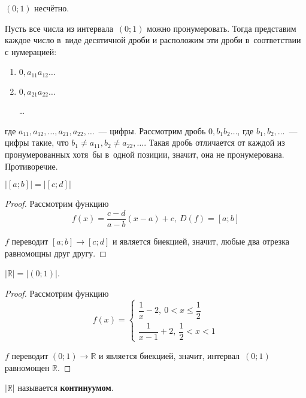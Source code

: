 \begin{statement}
$(0; 1)$ несчётно.
\end{statement}
\begin{proofcontra}
Пусть все числа из интервала~$(0; 1)$ можно пронумеровать.
Тогда представим каждое число в~виде десятичной дроби и расположим эти дроби в~соответствии с нумерацией:
\begin{enumerate}
	\item $0{,}a_{11}a_{12} \ldots$
	\item $0{,}a_{21}a_{22} \ldots$
	
	\ldots
\end{enumerate}
где $a_{11}, a_{12}, \ldots, a_{21}, a_{22}, \ldots$~--- цифры.
Рассмотрим дробь $0{,}b_1 b_2 \ldots$, где $b_1, b_2, \ldots$~--- цифры такие, что $b_1 \neq a_{11}, b_2 \neq a_{22}, \ldots$.
Такая дробь отличается от каждой из пронумерованных хотя~бы в~одной позиции, значит, она не пронумерована.
Противоречие.
\end{proofcontra}

\begin{statement}
$\left| [a; b] \right| = \left| [c; d] \right|$
\end{statement}
\begin{proof}
Рассмотрим функцию
\begin{equation*}
f(x) = \frac{c - d}{a - b} (x - a) + c, \ D(f) = [a; b]
\end{equation*}

$f$ переводит $[a; b] \to [c; d]$ и является биекцией, значит, любые два отрезка равномощны друг другу.
\end{proof}

\begin{statement}
$|\mathbb R| = |(0; 1)|$.
\end{statement}
\begin{proof}
Рассмотрим функцию
\begin{equation*}
f(x) =
\begin{cases}
\dfrac1x - 2, \ 0 < x \leqslant \dfrac12 \\
\dfrac1{x - 1} + 2, \ \dfrac12 < x < 1
\end{cases}
\end{equation*}

$f$ переводит $(0; 1) \to \mathbb R$ и является биекцией, значит, интервал~$(0; 1)$ равномощен $\mathbb R$.
\end{proof}

$|\mathbb R|$ называется \textbf{континуумом}.